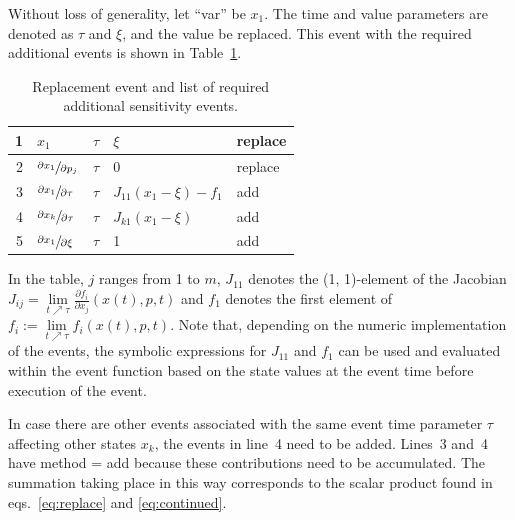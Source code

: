 \documentclass[journal, a4paper]{IEEEtran}
\begin{document}
Without loss of generality, let ``var'' be $x_1$. The time and value parameters are denoted as $\tau$ and $\xi$, and the value be replaced. This event with the required additional events is shown in Table~\ref{tab:replacement}.
\begin{table}[ht]
\caption{Replacement event and list of required additional sensitivity events.}
\label{tab:replacement}
\begin{center}
\begin{tabular}{|r|l|l|l|l|}\hline
     1 & $x_1$ & $\tau$ & $\xi$ & replace \\
     \hline
     2 & $\sfrac{\partial x_1}{\partial p_j}$ & $\tau$ & $0$ & replace \\
     3 & $\sfrac{\partial x_1}{\partial \tau}$ & $\tau$ & $J_{11}(x_1-\xi)-f_1$ & add \\
     4 & $\sfrac{\partial x_k}{\partial \tau}$ & $\tau$ & $J_{k1}(x_1-\xi)$ & add \\
     5 &$\sfrac{\partial x_1}{\partial \xi}$ & $\tau$ & 1 & add \\
     \hline
\end{tabular}
\end{center}
\end{table}
In the table, $j$ ranges from 1 to $m$, $J_{11}$ denotes the (1, 1)-element of the Jacobian $J_{ij} = \lim\limits_{t \nearrow \tau}\frac{\partial f_i}{\partial x_j}(x(t), p, t)$ and $f_1$ denotes the first element of $f_i := \lim\limits_{t \nearrow \tau}f_i(x(t), p, t)$. Note that, depending on the numeric implementation of the events, the symbolic expressions for $J_{11}$ and $f_1$ can be used and evaluated within the event function based on the state values at the event time before execution of the event.

In case there are other events associated with the same event time parameter $\tau$ affecting other states $x_k$, the events in line~4 need to be added. Lines~3 and~4 have method = add because these contributions need to be accumulated. The summation taking place in this way corresponds to the scalar product found in eqs.~\eqref{eq:replace} and \eqref{eq:continued}.
\end{document}
